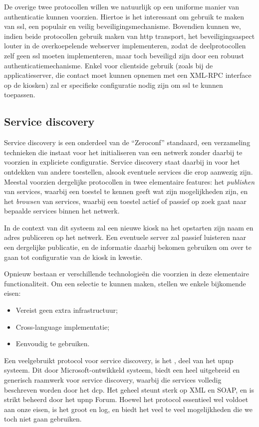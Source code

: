 \documentclass[verslag.tex]{subfiles}
\begin{document}
De overige twee protocollen willen we natuurlijk op een uniforme manier van authenticatie kunnen voorzien. Hiertoe is het interessant om gebruik te maken van \ac{ssl}, een populair en veilig beveiligingsmechanisme. Bovendien kunnen we, indien beide protocollen gebruik maken van \ac{http} transport, het beveiligingsaspect louter in de overkoepelende webserver implementeren, zodat de deelprotocollen zelf geen \ac{ssl} moeten implementeren, maar toch beveiligd zijn door een robuust authenticatiemechanisme. Enkel voor clientside gebruik (zoals bij de applicatieserver, die contact moet kunnen opnemen met een XML-RPC interface op de kiosken) zal er specifieke configuratie nodig zijn om \ac{ssl} te kunnen toepassen.

\subsection{Service discovery}

Service discovery is een onderdeel van de ``Zeroconf'' standaard, een verzameling technieken die instaat voor het initialiseren van een netwerk zonder daarbij te voorzien in expliciete configuratie. Service discovery staat daarbij in voor het ontdekken van andere toestellen, alsook eventuele services die erop aanwezig zijn. Meestal voorzien dergelijke protocollen in twee elementaire features: het \emph{publishen} van services, waarbij een toestel te kennen geeft wat zijn mogelijkheden zijn, en het \emph{browsen} van services, waarbij een toestel actief of passief op zoek gaat naar bepaalde services binnen het netwerk.

In de context van dit systeem zal een nieuwe kiosk na het opstarten zijn naam en adres publiceren op het netwerk. Een eventuele server zal passief luisteren naar een dergelijke publicatie, en de informatie daarbij bekomen gebruiken om over te gaan tot configuratie van de kiosk in kwestie.

Opnieuw bestaan er verschillende technologieën die voorzien in deze elementaire functionaliteit. Om een selectie te kunnen maken, stellen we enkele bijkomende eisen: 
\begin{itemize}
\item Vereist geen extra infrastructuur;
\item Cross-language implementatie;
\item Eenvoudig te gebruiken.
\end{itemize}

Een veelgebruikt protocol voor service discovery, is het  , deel van het \ac{upnp} systeem. Dit door Microsoft-ontwikkeld systeem, biedt een heel uitgebreid en generisch raamwerk voor service discovery, waarbij die services volledig beschreven worden door het \ac{dcp}. Het geheel steunt sterk op XML en SOAP, en is strikt beheerd door het \ac{upnp} Forum. Hoewel het protocol essentieel wel voldoet aan onze eisen, is het groot en log, en biedt het veel te veel mogelijkheden die we toch niet gaan gebruiken.
\end{document}

